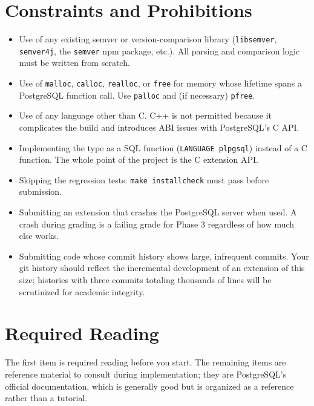 \documentclass[11pt,a4paper]{article}
\begin{document}
\section{Constraints and Prohibitions}

\begin{notebox}
\begin{itemize}
\item Use of any existing semver or version-comparison library (\texttt{libsemver}, \texttt{semver4j}, the \texttt{semver} npm package, etc.). All parsing and comparison logic must be written from scratch.
\item Use of \texttt{malloc}, \texttt{calloc}, \texttt{realloc}, or \texttt{free} for memory whose lifetime spans a PostgreSQL function call. Use \texttt{palloc} and (if necessary) \texttt{pfree}.
\item Use of any language other than C. C++ is not permitted because it complicates the build and introduces ABI issues with PostgreSQL's C API.
\item Implementing the type as a SQL function (\texttt{LANGUAGE plpgsql}) instead of a C function. The whole point of the project is the C extension API.
\item Skipping the regression tests. \texttt{make installcheck} must pass before submission.
\item Submitting an extension that crashes the PostgreSQL server when used. A crash during grading is a failing grade for Phase 3 regardless of how much else works.
\item Submitting code whose commit history shows large, infrequent commits. Your git history should reflect the incremental development of an extension of this size; histories with three commits totaling thousands of lines will be scrutinized for academic integrity.
\end{itemize}
\end{notebox}

\section{Required Reading}

The first item is required reading before you start. The remaining items are reference material to consult during implementation; they are PostgreSQL's official documentation, which is generally good but is organized as a reference rather than a tutorial.
\end{document}
